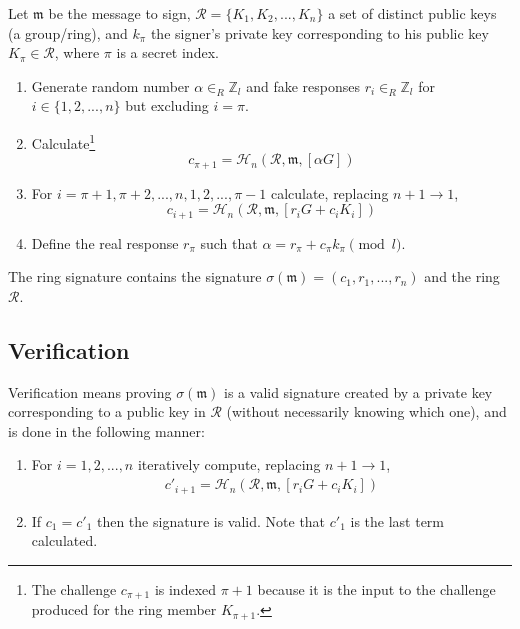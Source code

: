Let \(\mathfrak{m}\) be the message to sign, \(\mathcal{R} = \{K_1, K_2, ..., K_n\}\) a set of distinct public keys (a group/ring), and \(k_\pi\) the signer's private key corresponding to his public key \(K_\pi \in \mathcal{R}\), where $\pi$ is a secret index.

\begin{enumerate}
	\item Generate random number \(\alpha \in_R \mathbb{Z}_l\) and fake responses  \(r_i \in_R \mathbb{Z}_l\) for \(i \in \{1, 2, ..., n\}\) but excluding \(i = \pi\).

	\item Calculate\footnote{The challenge $c_{\pi + 1}$ is indexed $\pi + 1$ because it is the input to the challenge produced for the ring member $K_{\pi + 1}$.}
	\[c_{\pi+1} = \mathcal{H}_n(\mathcal{R}, \mathfrak{m}, [\alpha G])\]

	\item For \(i = \pi+1, \pi+2, ..., n, 1, 2, ..., \pi-1\) calculate, replacing \(n + 1 \rightarrow 1\),\vspace{.175cm}
	\[  c_{i+1} = \mathcal{H}_n(\mathcal{R}, \mathfrak{m}, [r_i G + c_i K_i])\] 

	\item Define the real response $r_\pi$ such that \(\alpha = r_\pi + c_\pi k_\pi \pmod l\).
\end{enumerate}

The ring signature contains the signature \(\sigma(\mathfrak{m}) = (c_1, r_1, ..., r_n) \) and the ring $\mathcal{R}$.


\subsection*{Verification}

Verification means proving $\sigma(\mathfrak{m})$ is a valid signature created by a private key corresponding to a public key in $\mathcal{R}$ (without necessarily knowing which one), and is done in the following manner:

\begin{enumerate}
	\item For \(i = 1, 2, ..., n\) iteratively compute, replacing \(n + 1 \rightarrow 1\),\vspace{.175cm}
	\begin{align*}
	c'_{i+1}   = \mathcal{H}_n(\mathcal{R}, \mathfrak{m}, [r_i G + c_i {K_i}])
	\end{align*}

	\item If \(c_1 = c'_1\) then the signature is valid. Note that $c'_1$ is the last term calculated.
\end{enumerate}

